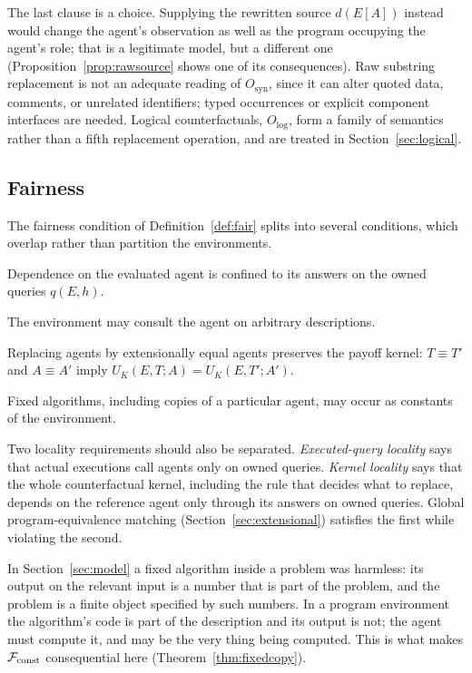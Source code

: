 The last clause is a choice. Supplying the rewritten source $d(E[A])$ instead would change the
agent's observation as well as the program occupying the agent's role; that is a legitimate model,
but a different one (Proposition~\ref{prop:rawsource} shows one of its consequences). Raw
substring replacement is not an adequate reading of $O_{\mathrm{syn}}$, since it can alter quoted
data, comments, or unrelated identifiers; typed occurrences or explicit component interfaces are
needed. Logical counterfactuals, $O_{\mathrm{log}}$, form a family of semantics rather than a fifth
replacement operation, and are treated in Section~\ref{sec:logical}.

\subsection{Fairness}

The fairness condition of Definition~\ref{def:fair} splits into several conditions, which overlap
rather than partition the environments.
\begin{description}[font=\normalfont,leftmargin=2.4em,labelwidth=1.6em,labelsep=.8em,itemsep=.35em]
  \item[$\cls_{\mathrm{self}}$] Dependence on the evaluated agent is confined to its answers on the
        owned queries $q(E,h)$.
  \item[$\cls_{\mathrm{any}}$] The environment may consult the agent on arbitrary descriptions.
  \item[$\cls_{\mathrm{ext}}$] Replacing agents by extensionally equal agents preserves the payoff
        kernel: $T\equiv T'$ and $A\equiv A'$ imply $U_K(E,T;A)=U_K(E,T';A')$.
  \item[$\cls_{\mathrm{const}}$] Fixed algorithms, including copies of a particular agent, may occur
        as constants of the environment.
\end{description}
Two locality requirements should also be separated. \emph{Executed-query locality} says that actual
executions call agents only on owned queries. \emph{Kernel locality} says that the whole
counterfactual kernel, including the rule that decides what to replace, depends on the reference
agent only through its answers on owned queries. Global program-equivalence matching
(Section~\ref{sec:extensional}) satisfies the first while violating the second.

In Section~\ref{sec:model} a fixed algorithm inside a problem was harmless: its output on the
relevant input is a number that is part of the problem, and the problem is a finite object
specified by such numbers. In a program environment the algorithm's code is part of the description
and its output is not; the agent must compute it, and may be the very thing being computed. This is
what makes $\cls_{\mathrm{const}}$ consequential here (Theorem~\ref{thm:fixedcopy}).

